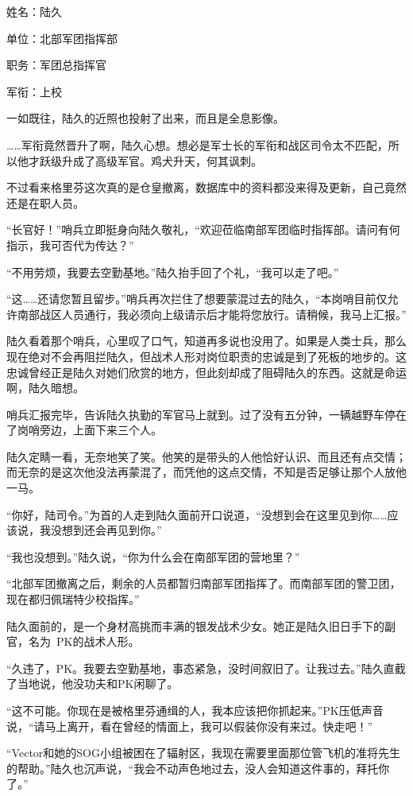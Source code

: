 姓名：陆久

单位：北部军团指挥部

职务：军团总指挥官

军衔：上校

一如既往，陆久的近照也投射了出来，而且是全息影像。

……军衔竟然晋升了啊，陆久心想。想必是军士长的军衔和战区司令太不匹配，所以他才跃级升成了高级军官。鸡犬升天，何其讽刺。

不过看来格里芬这次真的是仓皇撤离，数据库中的资料都没来得及更新，自己竟然还是在职人员。

“长官好！”哨兵立即挺身向陆久敬礼，“欢迎莅临南部军团临时指挥部。请问有何指示，我可否代为传达？”

“不用劳烦，我要去空勤基地。”陆久抬手回了个礼，“我可以走了吧。”

“这……还请您暂且留步。”哨兵再次拦住了想要蒙混过去的陆久，“本岗哨目前仅允许南部战区人员通行，我必须向上级请示后才能将您放行。请稍候，我马上汇报。”

陆久看着那个哨兵，心里叹了口气，知道再多说也没用了。如果是人类士兵，那么现在绝对不会再阻拦陆久，但战术人形对岗位职责的忠诚是到了死板的地步的。这忠诚曾经正是陆久对她们欣赏的地方，但此刻却成了阻碍陆久的东西。这就是命运啊，陆久暗想。

哨兵汇报完毕，告诉陆久执勤的军官马上就到。过了没有五分钟，一辆越野车停在了岗哨旁边，上面下来三个人。

陆久定睛一看，无奈地笑了笑。他笑的是带头的人他恰好认识、而且还有点交情；而无奈的是这次他没法再蒙混了，而凭他的这点交情，不知是否足够让那个人放他一马。

“你好，陆司令。”为首的人走到陆久面前开口说道，“没想到会在这里见到你……应该说，我没想到还会再见到你。”

“我也没想到。”陆久说，“你为什么会在南部军团的营地里？”

“北部军团撤离之后，剩余的人员都暂归南部军团指挥了。而南部军团的警卫团，现在都归佩瑞特少校指挥。”

陆久面前的，是一个身材高挑而丰满的银发战术少女。她正是陆久旧日手下的副官，名为 PK的战术人形。

“久违了，PK。我要去空勤基地，事态紧急，没时间叙旧了。让我过去。”陆久直截了当地说，他没功夫和PK闲聊了。

“这不可能。你现在是被格里芬通缉的人，我本应该把你抓起来。”PK压低声音说，“请马上离开，看在曾经的情面上，我可以假装你没有来过。快走吧！”

“Vector和她的SOG小组被困在了辐射区，我现在需要里面那位管飞机的准将先生的帮助。”陆久也沉声说，“我会不动声色地过去，没人会知道这件事的，拜托你了。”

